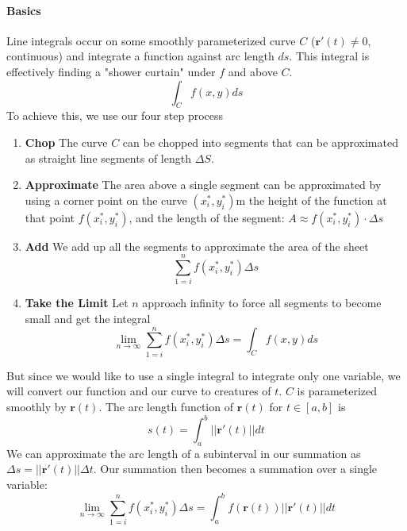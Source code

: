 \documentclass{article}
\begin{document}
\paragraph{Basics} Line integrals occur on some smoothly parameterized curve $C$ ($\mathbf{r}'(t) \neq 0$, continuous) and integrate a function against arc length $ds$. This integral is effectively finding a "shower curtain" under $f$ and above $C$.
\[ \int_C f(x,y) ds\]
To achieve this, we use our four step process
\begin{enumerate}
    \item \textbf{Chop} The curve $C$ can be chopped into segments that can be approximated as straight line segments of length $\Delta S$.
    \item \textbf{Approximate} The area above a single segment can be approximated by using a corner point on the curve $(x_i^*, y_i^*)$m the height of the function at that point $f(x_i^*, y_i^*)$, and the length of the segment: $A \approx f(x_i^*, y_i^*) \cdot \Delta s$
    \item \textbf{Add} We add up all the segments to approximate the area of the sheet
    \[ \sum_{1=i}^n f(x_i^*, y_i^*) \Delta s \]
    \item \textbf{Take the Limit} Let $n$ approach infinity to force all segments to become small and get the integral
    \[ \lim_{n \to \infty} \sum_{1=i}^n f(x_i^*, y_i^*) \Delta s = \int_C f(x,y)ds \]
\end{enumerate}
But since we would like to use a single integral to integrate only one variable, we will convert our function and our curve to creatures of $t$. $C$ is parameterized smoothly by $\mathbf{r}(t)$. The arc length function of $\mathbf{r}(t)$ for $t \in [a,b]$ is
\[ s(t) = \int_a^b ||\mathbf{r'}(t)||dt\]
We can approximate the arc length of a subinterval in our summation as $\Delta s = ||\mathbf{r}'(t)|| \Delta t$. Our summation then becomes a summation over a single variable:
\[ \lim_{n \to \infty} \sum_{1=i}^n f(x_i^*, y_i^*) \Delta s = \int_a^b f(\mathbf{r}(t))||\mathbf{r}'(t)||dt  \]
\end{document}
